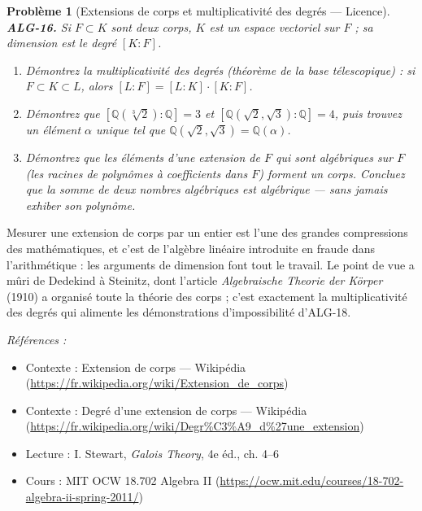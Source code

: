 \documentclass[11pt]{article}
\newtheorem{problem}{Problème}
\newenvironment{refs}{\par\small\noindent\emph{Références :}\begin{itemize}\setlength\itemsep{0pt}}{\end{itemize}\normalsize}
\begin{document}
\begin{problem}[{Extensions de corps et multiplicativité des degrés --- Licence}]
\textbf{ALG-16.} Si $F \subset K$ sont deux corps, $K$ est un espace vectoriel sur
$F$ ; sa dimension est le \textit{degré} $[K : F]$.
\begin{enumerate}
\item[(i)] Démontrez la multiplicativité des degrés (théorème de la base
télescopique) : si $F \subset K \subset L$, alors $[L : F] = [L : K] \cdot [K : F]$.
\item[(ii)] Démontrez que
$[\mathbb{Q}(\sqrt[3]{2}) : \mathbb{Q}] = 3$ et
$[\mathbb{Q}(\sqrt{2}, \sqrt{3}) : \mathbb{Q}] = 4$, puis trouvez un élément $\alpha$
unique tel que $\mathbb{Q}(\sqrt{2}, \sqrt{3}) = \mathbb{Q}(\alpha)$.
\item[(iii)] Démontrez que les éléments d'une
extension de $F$ qui sont algébriques sur $F$ (les racines de polynômes à coefficients dans
$F$) forment un corps. Concluez que la somme de deux nombres algébriques est algébrique --- sans jamais
exhiber son polynôme.
\end{enumerate}

\end{problem}

\noindent Mesurer une extension de corps par un entier est l'une des grandes compressions des
mathématiques, et c'est de l'algèbre linéaire introduite en fraude dans l'arithmétique : les arguments de
dimension font tout le travail. Le point de vue a mûri de Dedekind à Steinitz, dont l'article \textit{Algebraische
Theorie der Körper} (1910) a organisé toute la théorie des corps ; c'est exactement la multiplicativité des
degrés qui alimente les démonstrations d'impossibilité d'ALG-18.

\begin{refs}
\item Contexte : Extension de corps --- Wikipédia (\url{https://fr.wikipedia.org/wiki/Extension_de_corps})
\item Contexte : Degré d'une extension de corps --- Wikipédia (\url{https://fr.wikipedia.org/wiki/Degr%C3%A9_d%27une_extension})
\item Lecture : I. Stewart, \textit{Galois Theory}, 4e éd., ch. 4--6
\item Cours : MIT OCW 18.702 Algebra II (\url{https://ocw.mit.edu/courses/18-702-algebra-ii-spring-2011/})
\end{refs}

\bigskip
\end{document}
